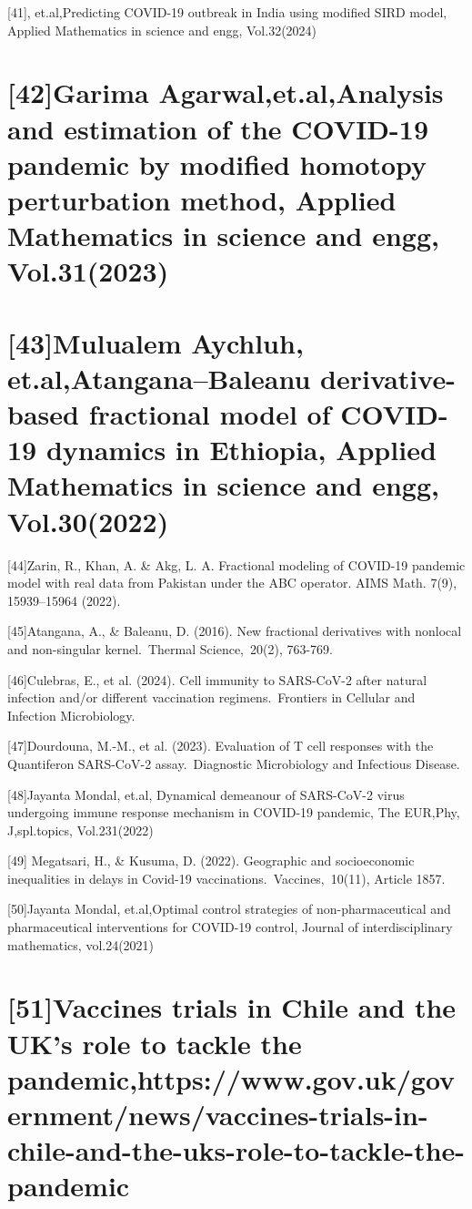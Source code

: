 \documentclass[10pt]{NSP1}
\begin{document}
[41], et.al,Predicting COVID-19 outbreak in India using modified SIRD model, Applied Mathematics in science and engg, Vol.32(2024)

\section*{[42]Garima Agarwal,et.al,Analysis and estimation of the COVID-19 pandemic by modified homotopy perturbation method, Applied Mathematics in science and engg, Vol.31(2023)}

\section*{[43]Mulualem Aychluh, et.al,Atangana–Baleanu derivative-based fractional model of COVID-19 dynamics in Ethiopia, Applied Mathematics in science and engg, Vol.30(2022)}

[44]Zarin, R., Khan, A. \& Akg, L. A. Fractional modeling of COVID-19 pandemic model with real data from Pakistan under the ABC operator. AIMS Math. 7(9), 15939–15964 (2022).

[45]Atangana, A., \& Baleanu, D. (2016). New fractional derivatives with nonlocal and non-singular kernel. Thermal Science, 20(2), 763-769.

[46]Culebras, E., et al. (2024). Cell immunity to SARS-CoV-2 after natural infection and/or different vaccination regimens. Frontiers in Cellular and Infection Microbiology.

[47]Dourdouna, M.-M., et al. (2023). Evaluation of T cell responses with the Quantiferon SARS-CoV-2 assay. Diagnostic Microbiology and Infectious Disease.

[48]Jayanta Mondal, et.al, Dynamical demeanour of SARS-CoV-2 virus undergoing immune response mechanism in COVID-19 pandemic, The EUR,Phy, J,spl.topics, Vol.231(2022)

[49] Megatsari, H., \& Kusuma, D. (2022). Geographic and socioeconomic inequalities in delays in Covid-19 vaccinations. Vaccines, 10(11), Article 1857.

[50]Jayanta Mondal, et.al,Optimal control strategies of non-pharmaceutical and pharmaceutical interventions for COVID-19 control, Journal of interdisciplinary mathematics, vol.24(2021)

\section*{[51]Vaccines trials in Chile and the UK’s role to tackle the pandemic,https://www.gov.uk/government/news/vaccines-trials-in-chile-and-the-uks-role-to-tackle-the-pandemic}
\end{document}
